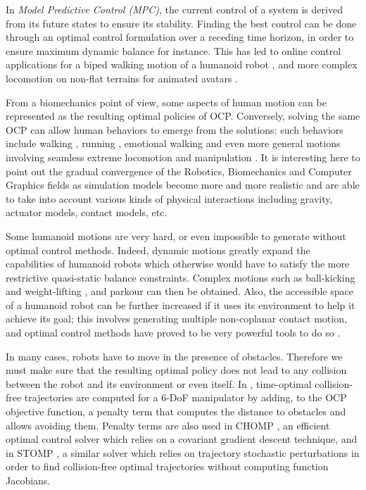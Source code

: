 In \emph{Model Predictive Control (MPC)}, the current control of a
system is derived from its future states to ensure its
stability. Finding the best control can be done through an optimal
control formulation over a receding time horizon, in order to ensure
maximum dynamic balance for instance. This has led to online control
applications for a biped walking motion of a humanoid robot
\cite{kaji03,herdt2010online}, and more complex locomotion on non-flat
terrains for animated avatars
\cite{coros2010generalized,tassa2012synthesis}.

From a biomechanics point of view, some aspects of human motion can be
represented as the resulting optimal policies of OCP. Conversely,
solving the same OCP can allow human behaviors to emerge from the
solutions: such behaviors include walking
\cite{chevallereau2001optimal}, running \cite{Schultz2010}, emotional
walking \cite{felis2012modeling} and even more general motions
involving seamless extreme locomotion and manipulation
\cite{mordatch2012discovery}. It is interesting here to point out the
gradual convergence of the Robotics, Biomechanics and Computer
Graphics fields as simulation models become more and more realistic
and are able to take into account various kinds of physical
interactions including gravity, actuator models, contact models, etc.

Some humanoid motions are very hard, or even impossible to generate
without optimal control methods. Indeed, dynamic motions greatly
expand the capabilities of humanoid robots which otherwise would have
to satisfy the more restrictive quasi-static balance
constraints. Complex motions such as ball-kicking
\cite{miossec2006development} and weight-lifting
\cite{arisumi2008dynamic}, and parkour \cite{dellin2012framework} can
then be obtained. Also, the accessible space of a humanoid robot can
be further increased if it uses its environment to help it achieve its
goal; this involves generating multiple non-coplanar contact motion,
and optimal control methods have proved to be very powerful tools to
do so \cite{lengagne2011generation}.

\bigskip

In many cases, robots have to move in the presence of
obstacles. Therefore we must make sure that the resulting optimal
policy does not lead to any collision between the robot and its
environment or even itself. In \cite{dubowsky1986time}, time-optimal
collision-free trajectories are computed for a 6-DoF manipulator by
adding, to the OCP objective function, a penalty term that computes
the distance to obstacles and allows avoiding them. Penalty terms
are also used in \textsc{CHOMP} \cite{ratliff2009chomp}, an efficient
optimal control solver which relies on a covariant gradient descent
technique, and in \textsc{STOMP} \cite{Kalakrishnan2011}, a similar
solver which relies on trajectory stochastic perturbations in order to
find collision-free optimal trajectories without computing function
Jacobians.

